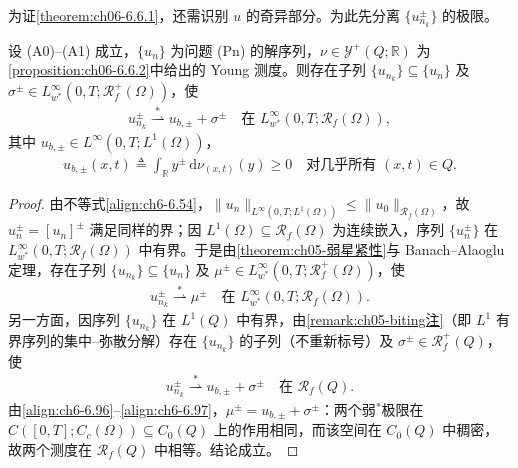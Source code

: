 \documentclass[../../main.tex]{subfiles}%
\begin{document}
为证\cref{theorem:ch06-6.6.1}，还需识别 $u$ 的奇异部分。为此先分离 $\{u^\pm_{n_k}\}$ 的极限。

\begin{proposition}\label{proposition:ch06-6.6.3}
设 (A0)--(A1) 成立，$\{u_n\}$ 为问题 (Pn) 的解序列，$\nu\in\mathcal{Y}^+(Q;\mathbb{R})$ 为\cref{proposition:ch06-6.6.2}中给出的 Young 测度。则存在子列 $\{u_{n_k}\}\subseteq\{u_n\}$ 及 $\sigma^\pm\in L^\infty_{w^*}(0,T;\mathscr{R}^+_f(\Omega))$，使
\begin{align}
u^\pm_{n_k}\stackrel{*}{\rightharpoonup}u_{b,\pm}+\sigma^\pm
\quad\text{在 }L^\infty_{w^*}(0,T;\mathscr{R}_f(\Omega)), \label{align:ch6-6.94}
\end{align}
其中 $u_{b,\pm}\in L^\infty(0,T;L^1(\Omega))$，
\begin{align}
u_{b,\pm}(x,t)\triangleq \int_\mathbb{R}y^\pm\,\mathrm{d}\nu_{(x,t)}(y)\geqslant0
\quad\text{对几乎所有 }(x,t)\in Q. \label{align:ch6-6.95}
\end{align}
\end{proposition}

\begin{proof}
由不等式\eqref{align:ch6-6.54}，$\|u_n\|_{L^\infty(0,T;L^1(\Omega))}\leqslant\|u_0\|_{\mathscr{R}_f(\Omega)}$，故 $u^\pm_n=[u_n]^\pm$ 满足同样的界；因 $L^1(\Omega)\subseteq\mathscr{R}_f(\Omega)$ 为连续嵌入，序列 $\{u^\pm_n\}$ 在 $L^\infty_{w^*}(0,T;\mathscr{R}_f(\Omega))$ 中有界。于是由\cref{theorem:ch05-弱星紧性}与 Banach--Alaoglu 定理，存在子列 $\{u_{n_k}\}\subseteq\{u_n\}$ 及 $\mu^\pm\in L^\infty_{w^*}(0,T;\mathscr{R}^+_f(\Omega))$，使
\begin{align}
u^\pm_{n_k}\stackrel{*}{\rightharpoonup}\mu^\pm
\quad\text{在 }L^\infty_{w^*}(0,T;\mathscr{R}_f(\Omega)). \label{align:ch6-6.96}
\end{align}
另一方面，因序列 $\{u_{n_k}\}$ 在 $L^1(Q)$ 中有界，由\cref{remark:ch05-biting注}（即 $L^1$ 有界序列的集中–弥散分解）存在 $\{u_{n_k}\}$ 的子列（不重新标号）及 $\sigma^\pm\in\mathscr{R}^+_f(Q)$，使
\begin{align}
u^\pm_{n_k}\stackrel{*}{\rightharpoonup}u_{b,\pm}+\sigma^\pm
\quad\text{在 }\mathscr{R}_f(Q). \label{align:ch6-6.97}
\end{align}
由\eqref{align:ch6-6.96}--\eqref{align:ch6-6.97}，$\mu^\pm=u_{b,\pm}+\sigma^\pm$：两个弱$^*$极限在 $C([0,T];C_c(\Omega))\subseteq C_0(Q)$ 上的作用相同，而该空间在 $C_0(Q)$ 中稠密，故两个测度在 $\mathscr{R}_f(Q)$ 中相等。结论成立。
\end{proof}
\end{document}
